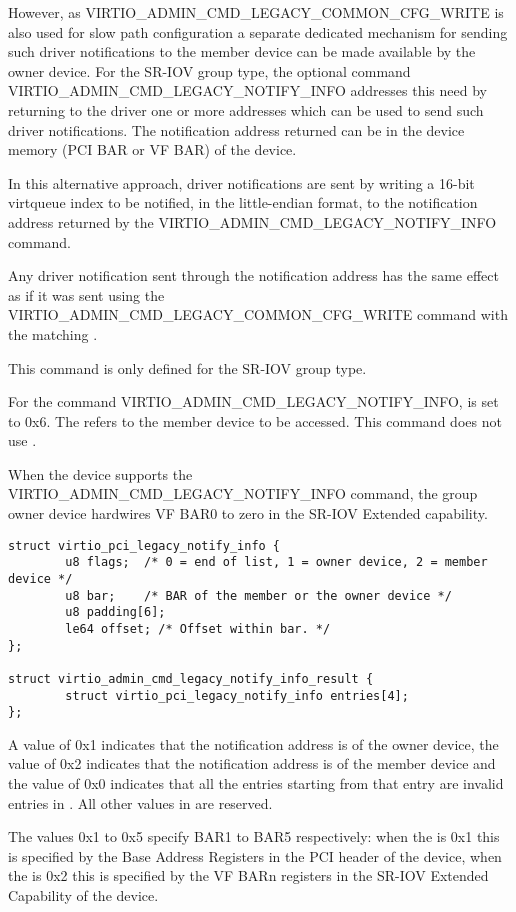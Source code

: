 However, as VIRTIO_ADMIN_CMD_LEGACY_COMMON_CFG_WRITE is also used for slow path
configuration a separate dedicated mechanism for sending such driver
notifications to the member device can be made available by the owner device.
For the SR-IOV group type, the optional command
VIRTIO_ADMIN_CMD_LEGACY_NOTIFY_INFO addresses this need by returning to the
driver one or more addresses which can be used to send such driver
notifications. The notification address returned can be in the device memory
(PCI BAR or VF BAR) of the device.

In this alternative approach, driver notifications are sent by
writing a 16-bit virtqueue index to be notified, in the little-endian
format, to the notification address returned by
the VIRTIO_ADMIN_CMD_LEGACY_NOTIFY_INFO command.

Any driver notification sent through the notification address has the same effect
as if it was sent using the VIRTIO_ADMIN_CMD_LEGACY_COMMON_CFG_WRITE command with
the  matching .

This command is only defined for the SR-IOV group type.

For the command VIRTIO_ADMIN_CMD_LEGACY_NOTIFY_INFO, 
is set to 0x6.
The  refers to the member device to be accessed.
This command does not use .

When the device supports the VIRTIO_ADMIN_CMD_LEGACY_NOTIFY_INFO command, the
group owner device hardwires VF BAR0 to zero in the SR-IOV Extended capability.

\begin{lstlisting}
struct virtio_pci_legacy_notify_info {
        u8 flags;  /* 0 = end of list, 1 = owner device, 2 = member device */
        u8 bar;    /* BAR of the member or the owner device */
        u8 padding[6];
        le64 offset; /* Offset within bar. */
};

struct virtio_admin_cmd_legacy_notify_info_result {
        struct virtio_pci_legacy_notify_info entries[4];
};
\end{lstlisting}

A  value of 0x1 indicates that the notification address is of
the owner device, the value of 0x2 indicates that the notification address is of
the member device and the value of 0x0 indicates that all the entries starting
from that entry are invalid entries in . All other values in
 are reserved.

The  values 0x1 to 0x5 specify BAR1 to BAR5 respectively:
when the  is 0x1 this is specified by the Base Address Registers
in the PCI header of the device,
when the  is 0x2 this is specified by the VF BARn
registers in the SR-IOV Extended Capability of the device.

